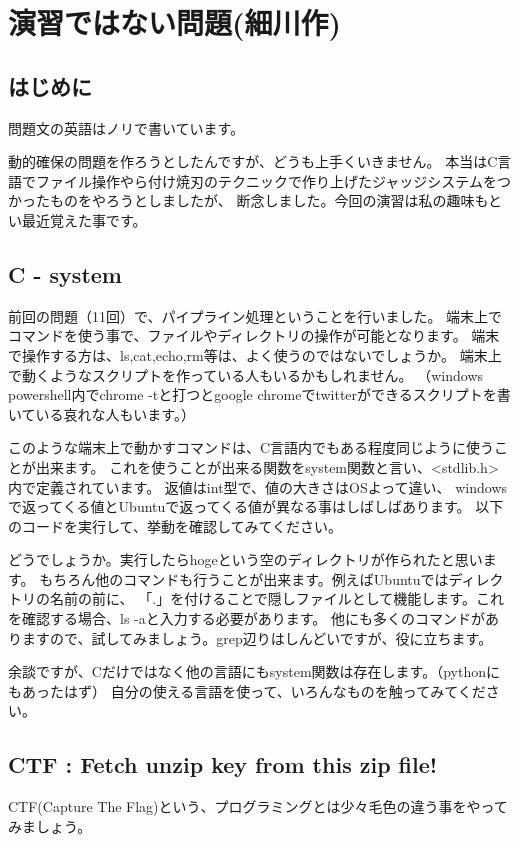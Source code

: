 \section{演習ではない問題(細川作)}
	\subsection{はじめに}
		問題文の英語はノリで書いています。
		
		動的確保の問題を作ろうとしたんですが、どうも上手くいきません。
		本当はC言語でファイル操作やら付け焼刃のテクニックで作り上げたジャッジシステムをつかったものをやろうとしましたが、
		断念しました。今回の演習は私の趣味もとい最近覚えた事です。
		
	\subsection{C - system}
		前回の問題（11回）で、パイプライン処理ということを行いました。
		端末上でコマンドを使う事で、ファイルやディレクトリの操作が可能となります。
		端末で操作する方は、ls,cat,echo,rm等は、よく使うのではないでしょうか。
		端末上で動くようなスクリプトを作っている人もいるかもしれません。
		（windows powershell内でchrome -tと打つとgoogle chromeでtwitterができるスクリプトを書いている哀れな人もいます。）
		
		このような端末上で動かすコマンドは、C言語内でもある程度同じように使うことが出来ます。
		これを使うことが出来る関数をsystem関数と言い、<stdlib.h>内で定義されています。
		返値はint型で、値の大きさはOSよって違い、
		windowsで返ってくる値とUbuntuで返ってくる値が異なる事はしばしばあります。
		以下のコードを実行して、挙動を確認してみてください。
		
		
		
		どうでしょうか。実行したらhogeという空のディレクトリが作られたと思います。
		もちろん他のコマンドも行うことが出来ます。例えばUbuntuではディレクトリの名前の前に、
		「.」を付けることで隠しファイルとして機能します。これを確認する場合、ls -aと入力する必要があります。
		他にも多くのコマンドがありますので、試してみましょう。grep辺りはしんどいですが、役に立ちます。
		
		余談ですが、Cだけではなく他の言語にもsystem関数は存在します。（pythonにもあったはず）
		自分の使える言語を使って、いろんなものを触ってみてください。
		
	\subsection{CTF : Fetch unzip key from this zip file!}
		CTF(Capture The Flag)という、プログラミングとは少々毛色の違う事をやってみましょう。

